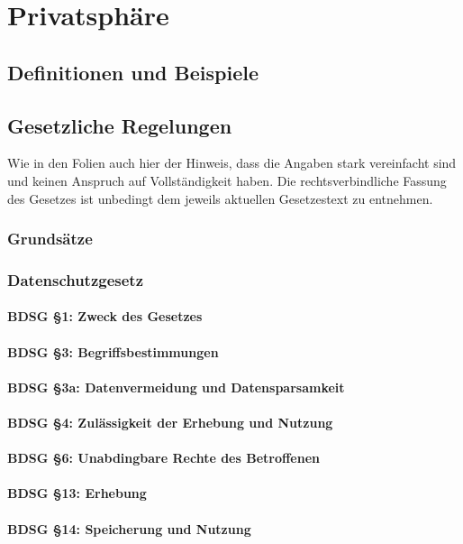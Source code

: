 \section{Privatsphäre}

\subsection{Definitionen und Beispiele}

\subsection{Gesetzliche Regelungen}
Wie in den Folien auch hier der Hinweis,
dass die Angaben stark vereinfacht sind und keinen Anspruch auf Vollständigkeit haben.
Die rechtsverbindliche Fassung des Gesetzes ist unbedingt dem jeweils aktuellen Gesetzestext zu entnehmen.
\subsubsection{Grundsätze}
\subsubsection{Datenschutzgesetz}
\paragraph{BDSG §1: Zweck des Gesetzes}
\paragraph{BDSG §3: Begriffsbestimmungen}
\paragraph{BDSG §3a: Datenvermeidung und Datensparsamkeit}
\paragraph{BDSG §4: Zulässigkeit der Erhebung und Nutzung}
\paragraph{BDSG §6: Unabdingbare Rechte des Betroffenen}
\paragraph{BDSG §13: Erhebung}
\paragraph{BDSG §14: Speicherung und Nutzung}
